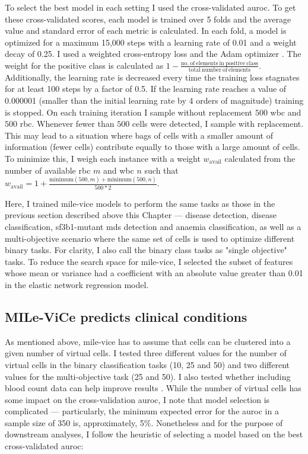 To select the best model in each setting I used the cross-validated \ac{auroc}. To get these cross-validated scores, each model is trained over 5 folds and the average value and standard error of each metric is calculated. In each fold, a model is optimized for a maximum 15,000 steps with a learning rate of 0.01 and a weight decay of 0.25. I used a weighted cross-entropy loss and the Adam optimizer \cite{Kingma2014-zd}. The weight for the positive class is calculated as $1 - \frac{\mathrm{no.\ of\ elements\ in\ positive\ class}}{\mathrm{total\ number\ of\ elements}}$. Additionally, the learning rate is decreased every time the training loss stagnates for at least 100 steps by a factor of 0.5. If the learning rate reaches a value of 0.000001 (smaller than the initial learning rate by 4 orders of magnitude) training is stopped. On each training iteration I sample without replacement $500$ \ac{wbc} and $500$ \ac{rbc}. Whenever fewer than $500$ cells were detected, I sample with replacement. This may lead to a situation where bags of cells with a smaller amount of information (fewer cells) contribute equally to those with a large amount of cells. To minimize this, I weigh each instance with a weight $w_{\mathrm{avail}}$ calculated from the number of available \ac{rbc} $m$ and \ac{wbc} $n$ such that $w_{\mathrm{avail}} = 1 + \frac{\mathrm{minimum}(500,m) + \mathrm{minimum}(500,n)}{500*2}$.

Here, I trained \ac{mile-vice} models to perform the same tasks as those in the previous section described above this Chapter ---  disease detection, disease classification, \ac{sf3b1}-mutant \ac{mds} detection and anaemia classification, as well as a multi-objective scenario where the same set of cells is used to optimize different binary tasks. For clarity, I also call the binary class tasks as "single objective" tasks. To reduce the search space for \ac{mile-vice}, I selected the subset of features whose mean or variance had a coefficient with an absolute value greater than 0.01 in the elastic network regression model.

\subsection{MILe-ViCe predicts clinical conditions}

As mentioned above, \ac{mile-vice} has to assume that cells can be clustered into a given number of virtual cells. I tested three different values for the number of virtual cells in the binary classification tasks (10, 25 and 50) and two different values for the multi-objective task (25 and 50). I also tested whether including blood count data can help improve results . While the number of virtual cells has some impact on the cross-validation \ac{auroc}, I note that model selection is complicated --- particularly, the minimum expected error for the \ac{auroc} in a sample size of 350 is, approximately, 5\%. Nonetheless and for the purpose of downstream analyses, I follow the heuristic of selecting a model based on the best cross-validated \ac{auroc}:

